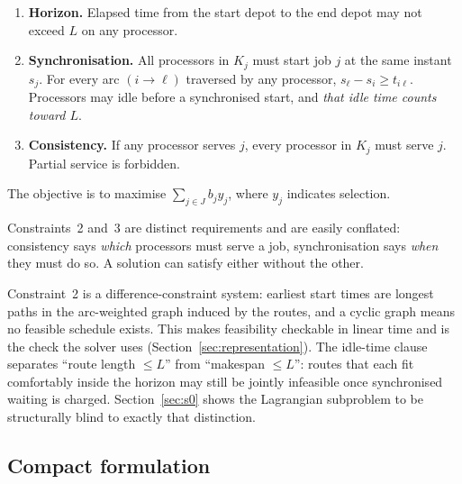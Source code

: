 \documentclass[11pt,a4paper]{article}
\newcommand{\Kj}{\ensuremath{K_j}}
\begin{document}
\begin{enumerate}
  \item \textbf{Horizon.} Elapsed time from the start depot to the end depot may
    not exceed $L$ on any processor.
  \item \textbf{Synchronisation.} All processors in $\Kj$ must start job $j$ at
    the same instant $s_j$. For every arc $(i\to \ell)$ traversed by any
    processor, $s_\ell-s_i\ge t_{i\ell}$. Processors may idle before a
    synchronised start, and \emph{that idle time counts toward $L$}.
  \item \textbf{Consistency.} If any processor serves $j$, every processor in
    $\Kj$ must serve $j$. Partial service is forbidden.
\end{enumerate}

The objective is to maximise $\sum_{j\in J} b_j y_j$, where $y_j$ indicates
selection.

Constraints~2 and~3 are distinct requirements and are easily conflated:
consistency says \emph{which} processors must serve a job, synchronisation says
\emph{when} they must do so. A solution can satisfy either without the other.

Constraint~2 is a difference-constraint system: earliest start times are longest
paths in the arc-weighted graph induced by the routes, and a cyclic graph means no
feasible schedule exists. This makes feasibility checkable in linear time and is
the check the solver uses (Section~\ref{sec:representation}). The idle-time clause
separates ``route length $\le L$'' from ``makespan $\le L$'': routes that each fit
comfortably inside the horizon may still be jointly infeasible once synchronised
waiting is charged. Section~\ref{sec:s0} shows the Lagrangian subproblem to be
structurally blind to exactly that distinction.

\subsection{Compact formulation}\label{sec:model}
\end{document}
